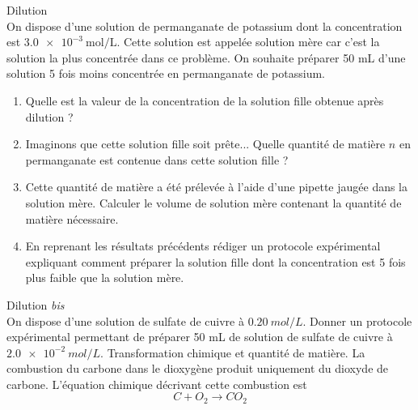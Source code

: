  \exo Dilution\\
 On dispose d'une solution de permanganate de potassium dont la concentration est $\SI{3,0e-3}{\mol\per\liter}$. Cette solution est appelée solution mère car c'est la solution la plus concentrée dans ce problème. On souhaite préparer 50 mL d'une solution 5 fois moins concentrée en permanganate de potassium.
 \begin{enumerate}
 \item Quelle est la valeur de la concentration de la solution fille obtenue après dilution ?
 \item Imaginons que cette solution fille soit prête... Quelle quantité de matière $n$ en permanganate est contenue dans cette solution fille ?
 \item Cette quantité de matière a été prélevée à l'aide d'une pipette jaugée dans la solution mère. Calculer le volume de solution mère contenant la quantité de matière nécessaire.
 \item En reprenant les résultats précédents rédiger un protocole expérimental expliquant comment préparer la solution fille dont la concentration est 5 fois plus faible que la solution mère.
 \end{enumerate}
 
 \exo
Dilution \emph{bis}
\\
On dispose d'une solution de sulfate de cuivre à $\SI{0.20}{mol/L}$. Donner un protocole expérimental permettant de préparer 50 mL de solution de sulfate de cuivre à $\SI{2.0e-2}{mol/L}$.
\newpage
\exo Transformation chimique et quantité de matière.
La combustion du carbone dans le dioxygène produit uniquement du dioxyde de carbone. L'équation chimique décrivant cette combustion est $$C+O_2\longrightarrow CO_2$$

